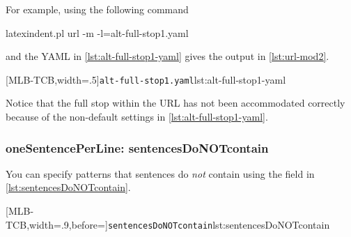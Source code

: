  \begin{example}
 For example, using the following command 

 \begin{commandshell}
latexindent.pl url -m -l=alt-full-stop1.yaml
\end{commandshell}

 and the YAML in \cref{lst:alt-full-stop1-yaml} gives the output in \cref{lst:url-mod2}.

 \begin{cmhtcbraster}[ raster left skip=-3.5cm,
   raster right skip=-2cm,
   raster force size=false,
   raster column 1/.style={add to width=.1\textwidth},
   raster column skip=.06\linewidth]
  [MLB-TCB,width=.5\textwidth]{\texttt{alt-full-stop1.yaml}}{lst:alt-full-stop1-yaml}
 \end{cmhtcbraster}

 Notice that the full stop within the URL has not been accommodated correctly because of
 the non-default settings in \cref{lst:alt-full-stop1-yaml}.
 \end{example}

\subsubsection{oneSentencePerLine: sentencesDoNOTcontain}
 You can specify patterns that sentences do \emph{not} contain using the field
  in
 \cref{lst:sentencesDoNOTcontain}.

 [MLB-TCB,width=.9\linewidth,before=\centering]{\texttt{sentencesDoNOTcontain}}{lst:sentencesDoNOTcontain}

